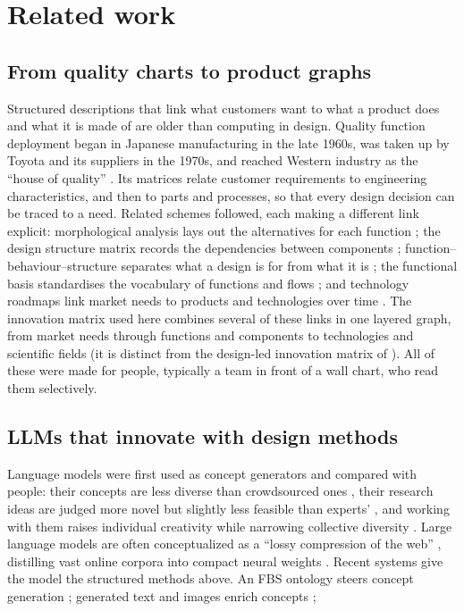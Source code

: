 \section{Related work}
\label{related-work}

\subsection{From quality charts to product graphs}

Structured descriptions that link what customers want to what a product does and what it is made of are older than computing in design. Quality function deployment began in Japanese manufacturing in the late 1960s, was taken up by Toyota and its suppliers in the 1970s, and reached Western industry as the ``house of quality'' \citep{ed2024,Hauser1988,Chan2002}. Its matrices relate customer requirements to engineering characteristics, and then to parts and processes, so that every design decision can be traced to a need. Related schemes followed, each making a different link explicit: morphological analysis lays out the alternatives for each function \citep{Zwicky1967,Ritchey2006,Ritchey2018}; the design structure matrix records the dependencies between components \citep{Steward1981,Browning2001,Eppinger2012}; function--behaviour--structure separates what a design is for from what it is \citep{Gero1990,Gero2004}; the functional basis standardises the vocabulary of functions and flows \citep{Stone2000,Hirtz2002}; and technology roadmaps link market needs to products and technologies over time \citep{Phaal2004}. The innovation matrix used here \citep{Tchirsky,berengueres2014} combines several of these links in one layered graph, from market needs through functions and components to technologies and scientific fields (it is distinct from the design-led innovation matrix of \citet{Kyffin2009}). All of these were made for people, typically a team in front of a wall chart, who read them selectively.

\subsection{LLMs that innovate with design methods}



Language models were first used as concept generators \citep{Zhu2022,Ma2023} and compared with people: their concepts are less diverse than crowdsourced ones \citep{Ma2025}, their research ideas are judged more novel but slightly less feasible than experts' \citep{Si2024}, and working with them raises individual creativity while narrowing collective diversity \citep{Doshi2024,Anderson2024,Ashkinaze2025,Wadinambiarachchi2024}. Large language models are often conceptualized as a ``lossy compression of the web'' \citep{Chiang2023}, distilling vast online corpora into compact neural weights \citep{Karpathy2023}. Recent systems give the model the structured methods above. An FBS ontology steers concept generation \citep{Chen2024a}; generated text and images enrich concepts \citep{Chen2024}; 

